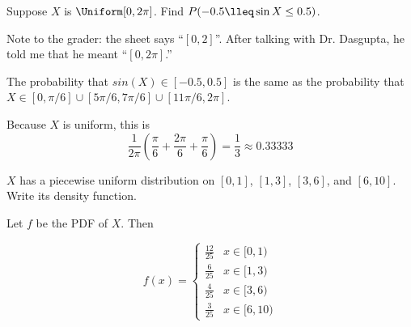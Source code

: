 \begin{problem}[Handout 12, \# 9]
  Suppose \(X\) is \(\Uniform[0,2 \pi]\). Find \(P(-0.5\lleq \sin X\leq
  0.5)\).
\end{problem}
\begin{solution}

Note to the grader: the sheet says ``$[0,2]$''. After talking with Dr. Dasgupta, he told me that he meant ``$[0,2\pi]$.''

The probability that $sin(X) \in [-0.5,0.5]$ is the same as the probability that $X \in [0,\pi/6] \cup [5\pi/6,7\pi/6] \cup [11\pi/6,2\pi]$.

Because $X$ is uniform, this is
\[
\frac{1}{2\pi} \left(\frac{\pi}{6} + \frac{2\pi}{6} + \frac{\pi}{6}\right) = \frac{1}{3} \approx 0.33333
\]

\end{solution}
\newpage

\begin{problem}[Handout 12, \# 13]
  \(X\) has a piecewise uniform distribution on \([0,1]\), \([1,3]\),
  \([3,6]\), and \([6,10]\). Write its density function.
\end{problem}
\begin{solution}

Let $f$ be the PDF of $X$. Then

\[ f(x) =

\begin{cases}
      \frac{12}{25} & x \in [0,1) \\
      \frac{6}{25} & x \in [1,3) \\
      \frac{4}{25} & x \in [3,6) \\
      \frac{3}{25} & x \in [6,10)
   \end{cases}
\]

\end{solution}
\newpage

